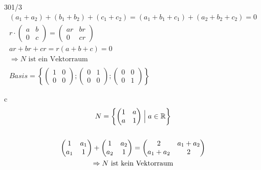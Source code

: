 \begin{exercise}{301/3}
\begin{gather*}
    (a_1 + a_2) + (b_1 + b_2) + (c_1 + c_2) = (a_1 + b_1 + c_1) + (a_2 + b_2 + c_2) = 0 \\
    r \cdot \begin{pmatrix}a & b \\ 0 & c\end{pmatrix} = \begin{pmatrix}ar & br \\ 0 & cr\end{pmatrix} \\
    ar + br + cr = r(a + b + c) = 0 \\
    \Rightarrow \text{$N$ ist ein Vektorraum} \\\\
    Basis = \left\{\begin{pmatrix}1 & 0 \\ 0 & 0\end{pmatrix}; \begin{pmatrix}0 & 1 \\ 0 & 0\end{pmatrix}; \begin{pmatrix}0 & 0 \\ 0 & 1\end{pmatrix}\right\}
  \end{gather*}
  \item [c]
  \begin{gather*}
    N = \left\{\begin{pmatrix}1 & a \\ a & 1\end{pmatrix} \Bigm| a \in \mathbb{R}\right\} \\\\
    \begin{pmatrix}1 & a_1 \\ a_1 & 1\end{pmatrix} + \begin{pmatrix}1 & a_2 \\ a_2 & 1\end{pmatrix} = \begin{pmatrix}2 & a_1 + a_2 \\ a_1 + a_2 & 2\end{pmatrix} \\
    \Rightarrow \text{$N$ ist kein Vektorraum}
  \end{gather*}
\end{exercise}

